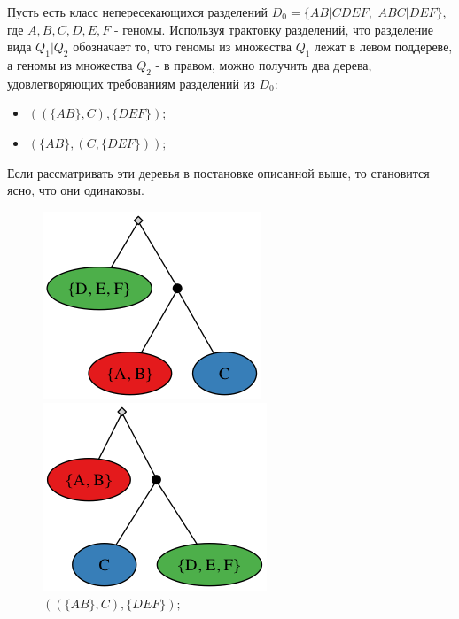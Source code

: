 \begin{example}
  Пусть есть класс непересекающихся разделений $D_0 = \{AB|CDEF,$ $ABC|DEF\}$, где $A, B, C, D, E, F$ - геномы.
  Используя трактовку разделений, что разделение вида $Q_1|Q_2$ обозначает то, что геномы из множества $Q_1$ лежат в левом поддереве,
  а геномы из множества $Q_2$ - в правом, можно получить два дерева, удовлетворяющих требованиям разделений из $D_0$:
  \begin{itemize}
    \item $((\{AB\}, C), \{DEF\});$
    \item $(\{AB\}, (C, \{DEF\}));$
  \end{itemize}
  Если рассматривать эти деревья в постановке описанной выше, то становится ясно, что они одинаковы.
  \begin{figure}[H]
    \centering
    \includegraphics[max width=\linewidth]{fig/2/similar_tree1.png}
      \caption{$((\{AB\}, C), \{DEF\});$}
    \endminipage
      \includegraphics[max width=\linewidth]{fig/2/similar_tree2.png}

\end{figure}
\end{example}
